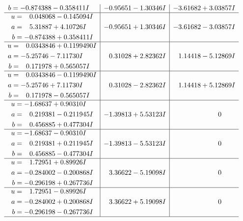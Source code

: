 \documentclass[1p]{elsarticle_modified}
\theoremstyle{definition}
\begin{document}
$$\begin{array}{c|c|c}
\begin{aligned}
b &= -0.874388 - 0.358411 I\end{aligned}
 & -0.95651 - 1.30346 I & -3.61682 + 3.03857 I \\ \hline\begin{aligned}
u &= \phantom{-}0.048068 - 0.145094 I \\
a &= \phantom{-}5.31887 + 4.10726 I \\
b &= -0.874388 + 0.358411 I\end{aligned}
 & -0.95651 + 1.30346 I & -3.61682 - 3.03857 I \\ \hline\begin{aligned}
u &= \phantom{-}0.0343846 + 0.1199490 I \\
a &= -5.25746 - 7.11730 I \\
b &= \phantom{-}0.171978 + 0.565057 I\end{aligned}
 & \phantom{-}0.31028 + 2.82362 I & \phantom{-}1.14418 - 5.12869 I \\ \hline\begin{aligned}
u &= \phantom{-}0.0343846 - 0.1199490 I \\
a &= -5.25746 + 7.11730 I \\
b &= \phantom{-}0.171978 - 0.565057 I\end{aligned}
 & \phantom{-}0.31028 - 2.82362 I & \phantom{-}1.14418 + 5.12869 I \\ \hline\begin{aligned}
u &= -1.68637 + 0.90310 I \\
a &= \phantom{-}0.219381 - 0.211945 I \\
b &= \phantom{-}0.456885 + 0.477304 I\end{aligned}
 & -1.39813 + 5.53123 I & \phantom{-0.000000 } 0 \\ \hline\begin{aligned}
u &= -1.68637 - 0.90310 I \\
a &= \phantom{-}0.219381 + 0.211945 I \\
b &= \phantom{-}0.456885 - 0.477304 I\end{aligned}
 & -1.39813 - 5.53123 I & \phantom{-0.000000 } 0 \\ \hline\begin{aligned}
u &= \phantom{-}1.72951 + 0.89926 I \\
a &= -0.284002 - 0.200868 I \\
b &= -0.296198 + 0.267736 I\end{aligned}
 & \phantom{-}3.36622 - 5.19098 I & \phantom{-0.000000 } 0 \\ \hline\begin{aligned}
u &= \phantom{-}1.72951 - 0.89926 I \\
a &= -0.284002 + 0.200868 I \\
b &= -0.296198 - 0.267736 I\end{aligned}
 & \phantom{-}3.36622 + 5.19098 I & \phantom{-0.000000 } 0\\
 \hline 
 \end{array}$$\newpage\newpage\renewcommand{\arraystretch}{1}
\end{document}
